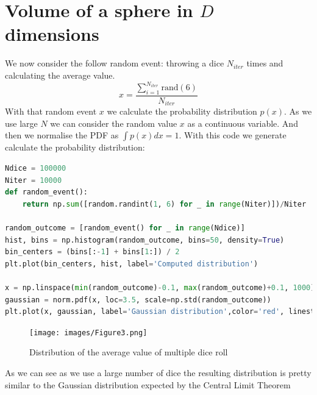 \documentclass{article}
\begin{document}
\section{Volume of a sphere in $D$ dimensions}
We now consider the follow random event: throwing a dice $N_{iter}$ times and calculating the average value.
\begin{equation}
    x=\frac{\sum_{i=1}^{N_{iter}}{\text{rand}(6)}}{N_{iter}}
\end{equation}
With that random event $x$ we calculate the probability distribution $p(x)$. As we use large $N$ we can consider the random value $x$ as a continuous variable. And then we normalise the PDF as $\int{p(x)dx}=1$.
With this code we generate calculate the probability distribution:
\begin{lstlisting}[language=Python]
Ndice = 100000
Niter = 10000
def random_event():
    return np.sum([random.randint(1, 6) for _ in range(Niter)])/Niter

random_outcome = [random_event() for _ in range(Ndice)]
hist, bins = np.histogram(random_outcome, bins=50, density=True)
bin_centers = (bins[:-1] + bins[1:]) / 2
plt.plot(bin_centers, hist, label='Computed distribution')

x = np.linspace(min(random_outcome)-0.1, max(random_outcome)+0.1, 1000)
gaussian = norm.pdf(x, loc=3.5, scale=np.std(random_outcome))
plt.plot(x, gaussian, label='Gaussian distribution',color='red', linestyle='--')
\end{lstlisting}
\begin{figure}[H]
    \centering
    \texttt{[image: images/Figure3.png]}
    \caption{Distribution of the average value of multiple dice roll}
    \label{fig:3}
\end{figure}
As we can see as we use a large number of dice the resulting distribution is pretty similar to the Gaussian distribution expected by the Central Limit Theorem
\clearpage
\end{document}
